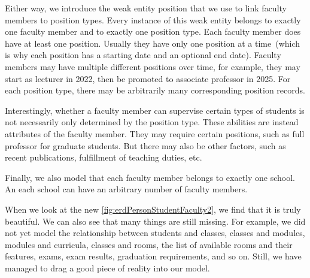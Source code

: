 Either way, we introduce the weak entity position that we use to link faculty members to position types.
Every instance of this weak entity belongs to exactly one faculty member and to exactly one position type.
Each faculty member does have at least one position.
Usually they have only one position at a time~(which is why each position has a starting date and an optional end date).
Faculty members may have multiple different positions over time, for example, they may start as lecturer in 2022, then be promoted to associate professor in 2025.
For each position type, there may be arbitrarily many corresponding position records.

Interestingly, whether a faculty member can supervise certain types of students is not necessarily only determined by the position type.
These abilities are instead attributes of the faculty member.
They may require certain positions, such as full professor for graduate students.
But there may also be other factors, such as recent publications, fulfillment of teaching duties, etc.

Finally, we also model that each faculty member belongs to exactly one school.
An each school can have an arbitrary number of faculty members.

When we look at the new \cref{fig:erdPersonStudentFaculty2}, we find that it is truly beautiful.
We can also see that many things are still missing.
For example, we did not yet model the relationship between students and classes, classes and modules, modules and curricula, classes and rooms, the list of available rooms and their features, exams, exam results, graduation requirements, and so on.
Still, we have managed to drag a good piece of reality into our model.%
%
\FloatBarrier%
\endhsection%
%
